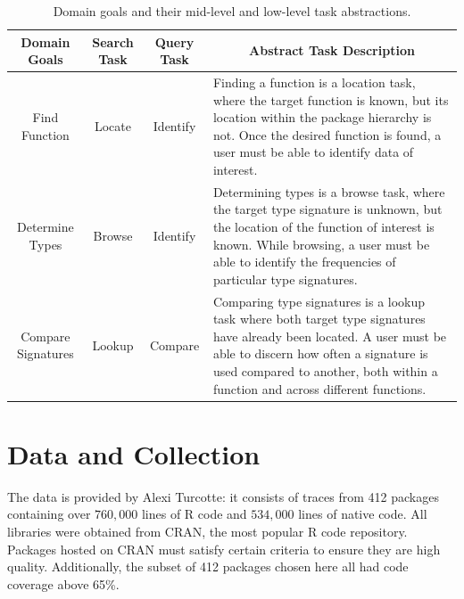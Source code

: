 \documentclass{vgtc}                          %
\begin{document}
\bgroup
\def\arraystretch{1.75}
\begin{table}
  \centering
  \begin{tabularx}{\linewidth}{c|c|c|X}
    Domain Goals & Search Task & Query Task & \multicolumn{1}{c}{Abstract Task Description} \\
    \hline
    Find Function & Locate & Identify & Finding a function is a location task, where the target function is known, but its location within the package hierarchy is not. Once the desired function is found, a user must be able to identify data of interest. \\

    Determine Types & Browse & Identify & Determining types is a browse task, where the target type signature is unknown, but the location of the function of interest is known. While browsing, a user must be able to identify the frequencies of particular type signatures.\\

    Compare Signatures & Lookup & Compare & Comparing type signatures is a lookup task where both target type signatures have already been located. A user must be able to discern how often a signature is used compared to another, both within a function and across different functions.\\
  \end{tabularx}
  \caption{Domain goals and their mid-level and low-level task abstractions.}
  \label{tab:tasks}
\end{table}
\egroup

\section{Data and Collection}


The data is provided by Alexi Turcotte:
it consists of traces from 412 packages
containing over $760,000$ lines of R code
and $534,000$ lines of native code.
All libraries were obtained from CRAN,
the most popular R code repository.
Packages hosted on CRAN must satisfy certain criteria
to ensure they are high quality.
Additionally, the subset of 412 packages chosen here
all had code coverage above 65\%.
\end{document}
